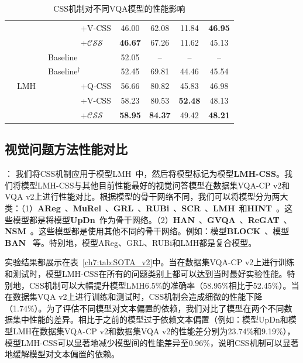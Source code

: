 \begin{table}[tbp]
\begin{center}
{\begin{tabular}{|l | l | l | c c c c|}
                & & ~~~~~~~~+V-CSS & 46.00 & 62.08 & 11.84 & \textbf{46.95} \\
                & & ~~~~~~~~+$\mathcal{CSS}$ & \textbf{46.67} & 67.26 & 11.62 & 45.13 \\
                \cline{2-7}
                & \multirow{5}{*}{LMH~\cite{clark2019don}} & Baseline & 52.05 & -- & --  & -- \\
                & & Baseline$^\dagger$ & 52.45 & 69.81 & 44.46 & 45.54 \\
                & & ~~~~~~~~+Q-CSS & 56.66 & 80.82 & 45.83 & 46.98 \\
                & & ~~~~~~~~+V-CSS & 58.23 & 80.53 & \textbf{52.48} & 48.13 \\
                & & ~~~~~~~~+$\mathcal{CSS}$ & \textbf{58.95} & \textbf{84.37} & 49.42 & \textbf{48.21} \\
                \hline
            \end{tabular}
        } %
    \end{center}
    \caption{CSS机制对不同VQA模型的性能影响}
    \label{ch7:tab:boost_models}
\end{table}

\subsection{视觉问题方法性能对比}

\textbf{}：
我们将CSS机制应用于模型LMH~\cite{clark2019don}中，然后将模型标记为模型\textbf{LMH-CSS}。我们将模型LMH-CSS与其他目前性能最好的视觉问答模型在数据集VQA-CP v2和VQA v2上进行性能对比。根据模型的骨干网络不同，我们可以将模型分为两大类：（1）\textbf{AReg}~\cite{ramakrishnan2018overcoming}、\textbf{MuRel}~\cite{cadene2019murel}、\textbf{GRL}~\cite{grand2019adversarial}、\textbf{RUBi}~\cite{cadene2019rubi}、\textbf{SCR}~\cite{wu2019self}、\textbf{LMH}~\cite{clark2019don}和\textbf{HINT}~\cite{selvaraju2019taking}。这些模型都是将模型\textbf{UpDn}~\cite{anderson2018bottom}作为骨干网络。（2）\textbf{HAN}~\cite{malinowski2018learning}、\textbf{GVQA}~\cite{agrawal2018don}、\textbf{ReGAT}~\cite{li2019relation}、\textbf{NSM}~\cite{hudson2019learning}。这些模型都是使用其他不同的骨干网络。例如：模型\textbf{BLOCK}~\cite{ben2019block}、模型\textbf{BAN}~\cite{kim2018bilinear} 等。特别地，模型AReg、GRL、RUBi和LMH都是复合模型。

实验结果都展示在表~\ref{ch7:tab:SOTA_v2}中。当在数据集VQA-CP v2上进行训练和测试时，模型LMH-CSS在所有的问题类别上都可以达到当时最好实验性能。特别地，CSS机制可以大幅提升模型LMH6.5\%的准确率（58.95\%相比于52.45\%）。当在数据集VQA v2上进行训练和测试时，CSS机制会造成细微的性能下降（1.74\%）。为了评估不同模型对文本偏置的依赖，我们对比了模型在两个不同数据集中性能的差异。相比于之前的模型过于依赖文本偏置（例如：模型UpDn和模型LMH在数据集VQA-CP v2和数据集VQA v2的性能差分别为23.74\%和9.19\%），模型LMH-CSS可以显著地减少模型间的性能差异至0.96\%，说明CSS机制可以显著地缓解模型对文本偏置的依赖。



